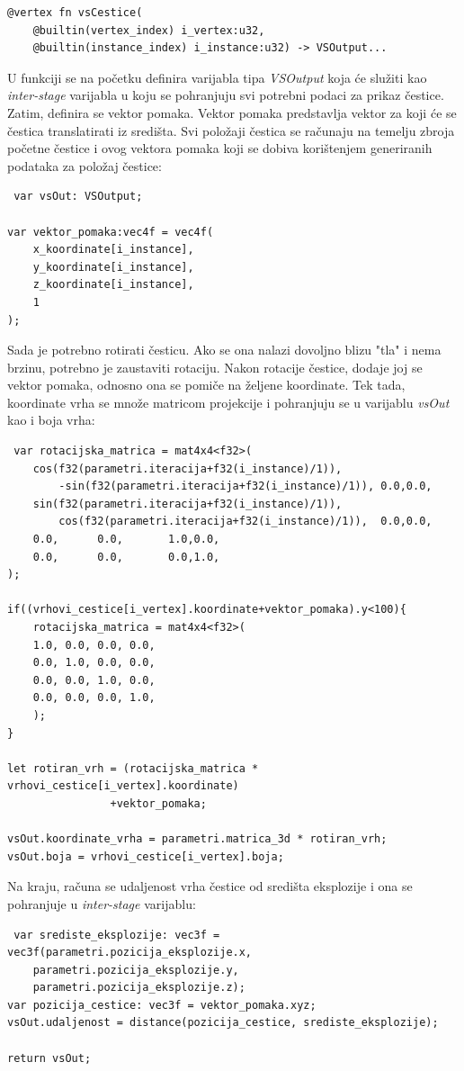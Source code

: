 \documentclass{foi}
\begin{document}
\begin{verbatim}
@vertex fn vsCestice(
	@builtin(vertex_index) i_vertex:u32,
	@builtin(instance_index) i_instance:u32) -> VSOutput...
\end{verbatim}

U funkciji se na početku definira varijabla tipa \textit{VSOutput} koja će služiti kao \textit{inter-stage} varijabla u koju se pohranjuju svi potrebni podaci za prikaz čestice. Zatim, definira se vektor pomaka. Vektor pomaka predstavlja vektor za koji će se čestica translatirati iz središta. Svi položaji čestica se računaju na temelju zbroja početne čestice i ovog vektora pomaka koji se dobiva korištenjem generiranih podataka za položaj čestice:
\begin{verbatim}
 var vsOut: VSOutput;

var vektor_pomaka:vec4f = vec4f(
	x_koordinate[i_instance],
	y_koordinate[i_instance],
	z_koordinate[i_instance],
	1
);

\end{verbatim}

Sada je potrebno rotirati česticu. Ako se ona nalazi dovoljno blizu "tla" i nema brzinu, potrebno je zaustaviti rotaciju. Nakon rotacije čestice, dodaje joj se vektor pomaka, odnosno ona se pomiče na željene koordinate. Tek tada, koordinate vrha se množe matricom projekcije i pohranjuju se u varijablu \textit{vsOut} kao i boja vrha:
\begin{verbatim}
 var rotacijska_matrica = mat4x4<f32>(
	cos(f32(parametri.iteracija+f32(i_instance)/1)),
		-sin(f32(parametri.iteracija+f32(i_instance)/1)), 0.0,0.0,
	sin(f32(parametri.iteracija+f32(i_instance)/1)),
		cos(f32(parametri.iteracija+f32(i_instance)/1)),  0.0,0.0,
	0.0,      0.0,       1.0,0.0,
	0.0,      0.0,       0.0,1.0,
);

if((vrhovi_cestice[i_vertex].koordinate+vektor_pomaka).y<100){
	rotacijska_matrica = mat4x4<f32>(
	1.0, 0.0, 0.0, 0.0,
	0.0, 1.0, 0.0, 0.0,
	0.0, 0.0, 1.0, 0.0,
	0.0, 0.0, 0.0, 1.0,
	);
}

let rotiran_vrh = (rotacijska_matrica *  vrhovi_cestice[i_vertex].koordinate)
				+vektor_pomaka;
				
vsOut.koordinate_vrha = parametri.matrica_3d * rotiran_vrh;
vsOut.boja = vrhovi_cestice[i_vertex].boja;
\end{verbatim}

Na kraju, računa se udaljenost vrha čestice od središta eksplozije i ona se pohranjuje u \textit{inter-stage} varijablu:

\begin{verbatim}
 var srediste_eksplozije: vec3f = vec3f(parametri.pozicija_eksplozije.x,
	parametri.pozicija_eksplozije.y,
	parametri.pozicija_eksplozije.z);
var pozicija_cestice: vec3f = vektor_pomaka.xyz;
vsOut.udaljenost = distance(pozicija_cestice, srediste_eksplozije);

return vsOut;
\end{verbatim}
\end{document}
